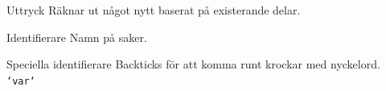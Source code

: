\ifkompendium\else

\begin{Slide}{Uttryck}
Räknar ut något nytt baserat på existerande delar.
\end{Slide}

\begin{Slide}{Identifierare}
Namn på saker.
\end{Slide}


\begin{Slide}{Speciella identifierare}
Backticks för att komma runt krockar med nyckelord. \texttt{`var`}
\end{Slide}

\fi



